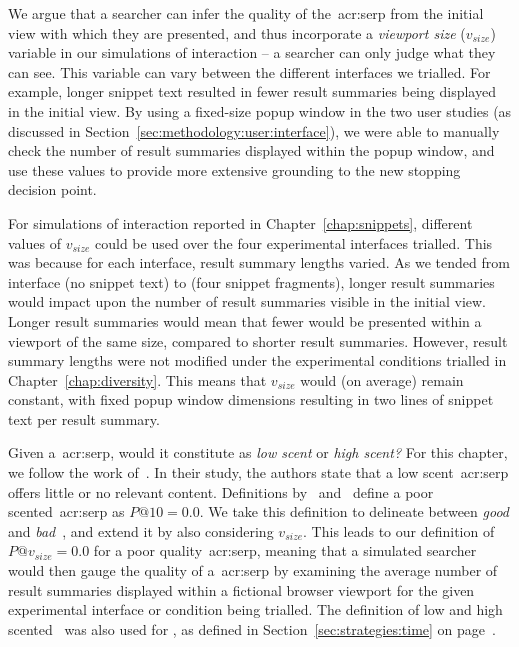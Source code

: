 We argue that a searcher can infer the quality of the~\gls{acr:serp} from the initial view with which they are presented, and thus incorporate a \emph{viewport size} ($v_{size}$) variable in our simulations of interaction -- a searcher can only judge what they can see. This variable can vary between the different interfaces we trialled. For example, longer snippet text resulted in fewer result summaries being displayed in the initial view. By using a fixed-size popup window in the two user studies (as discussed in Section~\ref{sec:methodology:user:interface}), we were able to manually check the number of result summaries displayed within the popup window, and use these values to provide more extensive grounding to the new stopping decision point.

For simulations of interaction reported in Chapter~\ref{chap:snippets}, different values of $v_{size}$ could be used over the four experimental interfaces trialled. This was because for each interface, result summary lengths varied. As we tended from interface  (no snippet text) to  (four snippet fragments), longer result summaries would impact upon the number of result summaries visible in the initial view. Longer result summaries would mean that fewer would be presented within a viewport of the same size, compared to shorter result summaries. However, result summary lengths were not modified under the experimental conditions trialled in Chapter~\ref{chap:diversity}. This means that $v_{size}$ would (on average) remain constant, with fixed popup window dimensions resulting in two lines of snippet text per result summary.

 Given a~\gls{acr:serp}, would it constitute as \emph{low scent} or \emph{high scent?} For this chapter, we follow the work of~\cite{wu2014information_scent}. In their study, the authors state that a low scent~\gls{acr:serp} offers little or no relevant content. Definitions by~\cite{wu2014information_scent} and~\cite{hassan2013serp_abandonment} define a poor scented~\gls{acr:serp} as $P@10=0.0$. We take this definition to delineate between \emph{good} and \emph{bad}~, and extend it by also considering $v_{size}$. This leads to our definition of $P@v_{size}=0.0$ for a poor quality~\gls{acr:serp}, meaning that a simulated searcher would then gauge the quality of a~\gls{acr:serp} by examining the average number of result summaries displayed within a fictional browser viewport for the given experimental interface or condition being trialled. The definition of low and high scented~ was also used for , as defined in Section~\ref{sec:strategies:time} on page~\pageref{sec:strategies:time}.

